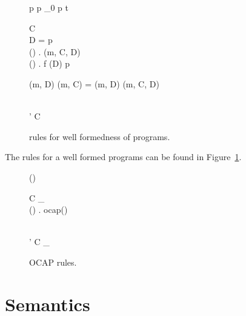 \begin{figure}[h]
  {p \vdash {} \andalso p \vdash \Gamma_0 \andalso
  }
  {p \vdash {} \:  \: t}

  \RuleSpace{}

  {C \vdash {} \\ D = \AnyRefType{} \lor
  p \vdash {} \\
  \forall () \in {} . \: \override(m,
  C, D) \\
  \forall () \in {} . \: f \notin \fields(D) }
  {p \vdash {}}

  \RuleSpace{}

  {\mtype(m, D) \lor \mtype(m, C) = \mtype(m, D)}
  {\override(m, C, D)}
  
  \RuleSpace{}

  {  \\
  \tau' \stof \tau}
  {C \vdash {}}
  \caption{\RACL{} rules for well formedness of programs.}
  \label{fig:wf_typing}
\end{figure}

The rules for a well formed programs can be found in Figure~\ref{fig:wf_typing}.

\begin{figure}
  {\ocap{(\AnyRefType{})}}

  \RuleSpace{}

  {\ocap(\CellType)}

  \RuleSpace{}

  { \andalso C \vdash_{\ocap}  \\
  \forall () \in {}. \: ocap(\sigma)}
  {}

  \RuleSpace{}

  { \\
  \tau' \stof \tau}
  {C \vdash_{\ocap} }
  \caption{\RACL{} OCAP rules.}
  \label{fig:ocap_typing}
\end{figure}


\section{Semantics}
\label{sec:semantics}

